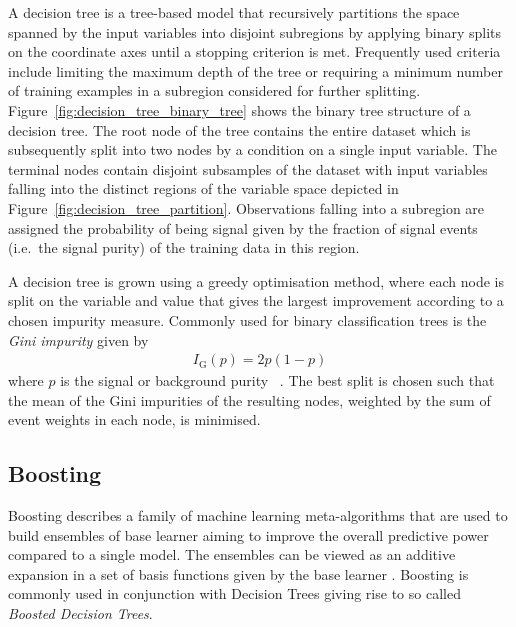 A decision tree is a tree-based model that recursively partitions the space
spanned by the input variables into disjoint subregions by applying binary
splits on the coordinate axes until a stopping criterion is met. Frequently used
criteria include limiting the maximum depth of the tree or requiring a minimum
number of training examples in a subregion considered for further splitting.
Figure~\ref{fig:decision_tree_binary_tree} shows the binary tree structure of a
decision tree. The root node of the tree contains the entire dataset which is
subsequently split into two nodes by a condition on a single input variable. The
terminal nodes contain disjoint subsamples of the dataset with input variables
falling into the distinct regions of the variable space depicted in
Figure~\ref{fig:decision_tree_partition}. Observations  falling into a subregion are assigned the probability of being signal
given by the fraction of signal events (i.e.\ the signal purity) of the training
data in this region.

A decision tree is grown using a greedy optimisation method, where each node is
split on the variable and value that gives the largest improvement according to
a chosen impurity measure. Commonly used for binary classification trees is the
\emph{Gini impurity} given by
\begin{align*}
  I_\text{G}(p) = 2 p (1 - p)
\end{align*}
where $p$ is the signal or background purity~\cite{esl} . The best split is chosen such that the mean of the
Gini impurities of the resulting nodes, weighted by the sum of event weights in
each node, is minimised.

\subsection{Boosting}
\label{sec:ml_boosting}

Boosting describes a family of machine learning meta-algorithms that are used to
build ensembles of base learner aiming to improve the overall predictive power
compared to a single model. The ensembles can be viewed as an additive expansion
in a set of basis functions given by the base learner \cite{esl}. Boosting is
commonly used in conjunction with Decision Trees giving rise to so called
\emph{Boosted Decision Trees}.

